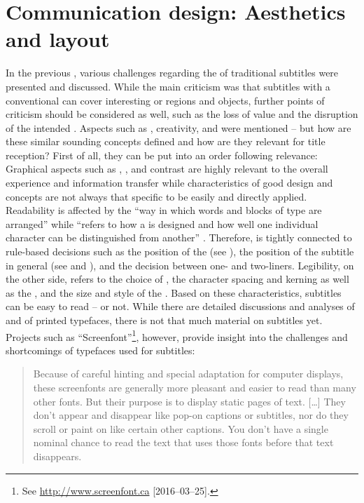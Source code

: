 \section{Communication design: Aesthetics and layout}\label{sec:3.1}

In the previous , various challenges regarding the  of traditional subtitles were presented and discussed. While the main criticism was that subtitles with a conventional  can cover interesting or  regions and objects, further points of criticism should be considered as well, such as the loss of  value and the disruption of the intended . Aspects such as , creativity, and  were mentioned – but how are these similar sounding concepts defined and how are they relevant for title reception? First of all, they can be put into an order following relevance: Graphical aspects such as , , and contrast are highly relevant to the overall experience and information transfer while characteristics of good design and  concepts are not always that specific to be easily and directly applied. Readability is affected by the “way in which words and blocks of type are arranged” \citep{Loyd2013} while  “refers to how a  is designed and how well one individual character can be distinguished from another” \citep{Loyd2013}. Therefore,  is tightly connected to rule-based decisions such as the position of the  (see ), the position of the subtitle in general (see  and ), and the decision between one- and two-liners. Legibility, on the other side, refers to the choice of , the character spacing and kerning as well as the , and the size and style of the . Based on these characteristics, subtitles can be easy to read – or not. While there are detailed discussions and analyses of  and  of printed typefaces, there is not that much material on subtitles yet. Projects such as “Screenfont”\footnote{See \url{http://www.screenfont.ca} [2016--03--25].}, however, provide insight into the challenges and shortcomings of typefaces used for subtitles:


\begin{quote}
Because of careful hinting and special adaptation for computer displays, these screenfonts are generally more pleasant and easier to read than many other fonts. But their purpose is to display static pages of text. […] They don’t appear and disappear like pop-on captions or subtitles, nor do they scroll or paint on like certain other captions. You don’t have a single nominal chance to read the text that uses those fonts before that text disappears. \citep{screenfont2016}
\end{quote}

